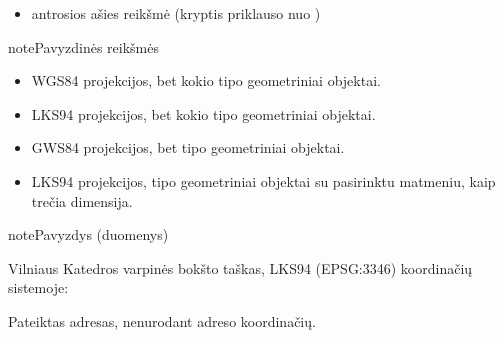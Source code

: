 \documentclass[letterpaper,10pt,lithuanian]{sphinxmanual}
\begin{document}
\begin{fulllineitems}
\begin{itemize}
\item {} 
\sphinxAtStartPar
{} \sphinxhyphen{} antrosios ašies reikšmė (kryptis priklauso nuo )

\end{itemize}

\begin{sphinxadmonition}{note}{Pavyzdinės  reikšmės}
\begin{itemize}
\item {} 
\sphinxAtStartPar
{} \sphinxhyphen{} WGS84 projekcijos, bet kokio  tipo geometriniai
objektai.

\item {} 
\sphinxAtStartPar
{} \sphinxhyphen{} LKS94 projekcijos, bet kokio tipo geometriniai
objektai.

\item {} 
\sphinxAtStartPar
{} \sphinxhyphen{} GWS84 projekcijos, bet  tipo geometriniai
objektai.

\item {} 
\sphinxAtStartPar
{} \sphinxhyphen{} LKS94 projekcijos,  tipo
geometriniai objektai su pasirinktu matmeniu, kaip trečia dimensija.

\end{itemize}
\end{sphinxadmonition}

\begin{sphinxadmonition}{note}{Pavyzdys (duomenys)}

\sphinxAtStartPar
Vilniaus Katedros varpinės bokšto taškas, LKS94 (EPSG:3346) koordinačių
sistemoje:

\begin{sphinxVerbatim}[commandchars=\\\{\}]
\end{sphinxVerbatim}
\end{sphinxadmonition}

\begin{sphinxtopic}
\begin{description}
\sphinxAtStartPar
Pateiktas adresas, nenurodant adreso koordinačių.


\end{description}
\end{sphinxtopic}
\end{fulllineitems}
\end{document}
